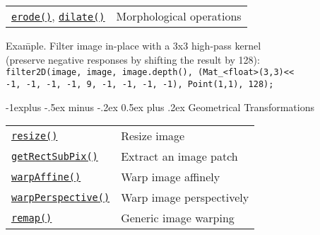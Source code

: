 \documentclass[10pt,landscape]{article}
\makeatletter
\renewcommand{\subsection}{\@startsection{subsection}{2}{0mm}%
                                {-1explus -.5ex minus -.2ex}%
                                {0.5ex plus .2ex}%
                                {\normalfont\normalsize\bfseries}}
\makeatother
\begin{document}
\begin{multicols}{3}
\begin{tabular}{@{}p{\the\MyLen}%
                @{}p{\linewidth-\the\MyLen}@{}}
\texttt{\href{http://opencv.willowgarage.com/documentation/cpp/imgproc_image_filtering.html\#cv-erode}{erode()}}, \texttt{\href{http://opencv.willowgarage.com/documentation/cpp/imgproc_image_filtering.html\#cv-dilate}{dilate()}} & Morphological operations \\

\end{tabular}

\begin{tabbing}
Exa\=mple. Filter image in-place with a 3x3 high-pass kernel\\
\> (preserve negative responses by shifting the result by 128):\\
\texttt{filter2D(image, image, image.depth(), (Mat\_<float>(3,3)<<}\\
\> \texttt{-1, -1, -1, -1, 9, -1, -1, -1, -1), Point(1,1), 128);}\\
\end{tabbing}

\subsection{Geometrical Transformations}

\begin{tabular}{@{}p{\the\MyLen}%
                @{}p{\linewidth-\the\MyLen}@{}}
\texttt{\href{http://opencv.willowgarage.com/documentation/cpp/imgproc_geometric_image_transformations.html\#cv-resize}{resize()}} & Resize image \\

\texttt{\href{http://opencv.willowgarage.com/documentation/cpp/imgproc_geometric_image_transformations.html\#cv-getrectsubpix}{getRectSubPix()}} & Extract an image patch \\

\texttt{\href{http://opencv.willowgarage.com/documentation/cpp/imgproc_geometric_image_transformations.html\#cv-warpaffine}{warpAffine()}} & Warp image affinely\\

\texttt{\href{http://opencv.willowgarage.com/documentation/cpp/imgproc_geometric_image_transformations.html\#cv-warpperspective}{warpPerspective()}} & Warp image perspectively\\

\texttt{\href{http://opencv.willowgarage.com/documentation/cpp/imgproc_geometric_image_transformations.html\#cv-remap}{remap()}} & Generic image warping\\


\end{tabular}
\end{multicols}
\end{document}
